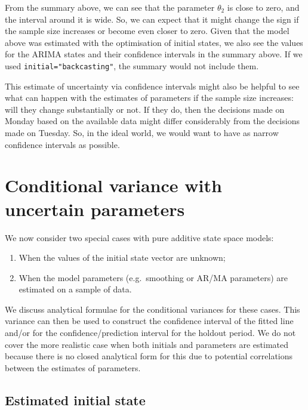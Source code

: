 \documentclass[]{book}
\providecommand{\tightlist}{%
  \setlength{\itemsep}{0pt}\setlength{\parskip}{0pt}}
\theoremstyle{definition}
\theoremstyle{definition}
\theoremstyle{definition}
\theoremstyle{definition}
\theoremstyle{remark}
\begin{document}
From the summary above, we can see that the parameter \(\theta_2\) is close to zero, and the interval around it is wide. So, we can expect that it might change the sign if the sample size increases or become even closer to zero. Given that the model above was estimated with the optimisation of initial states, we also see the values for the ARIMA states and their confidence intervals in the summary above. If we used \texttt{initial="backcasting"}, the summary would not include them.

This estimate of uncertainty via confidence intervals might also be helpful to see what can happen with the estimates of parameters if the sample size increases: will they change substantially or not. If they do, then the decisions made on Monday based on the available data might differ considerably from the decisions made on Tuesday. So, in the ideal world, we would want to have as narrow confidence intervals as possible.

\hypertarget{conditionalVarianceUncertainty}{%
\section{Conditional variance with uncertain parameters}\label{conditionalVarianceUncertainty}}

We now consider two special cases with pure additive state space models:

\begin{enumerate}
\def\labelenumi{(\arabic{enumi})}
\tightlist
\item
  When the values of the initial state vector are unknown;
\item
  When the model parameters (e.g.~smoothing or AR/MA parameters) are estimated on a sample of data.
\end{enumerate}

We discuss analytical formulae for the conditional variances for these cases. This variance can then be used to construct the confidence interval of the fitted line and/or for the confidence/prediction interval for the holdout period. We do not cover the more realistic case when both initials and parameters are estimated because there is no closed analytical form for this due to potential correlations between the estimates of parameters.

\hypertarget{estimated-initial-state}{%
\subsection{Estimated initial state}\label{estimated-initial-state}}
\end{document}
